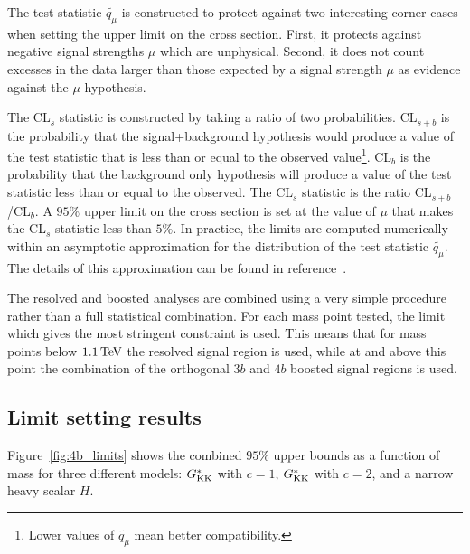 The test statistic $\widetilde{q_{\mu}}$ is constructed to protect against two interesting corner cases when setting the upper limit on the cross section. First, it protects against negative signal strengths $\mu$ which are unphysical. Second, it does not count excesses in the data larger than those expected by a signal strength $\mu$ as evidence against the $\mu$ hypothesis. 

The CL$_{s}$ statistic is constructed by taking a ratio of two probabilities. CL$_{s+b}$ is the probability that the signal+background hypothesis would produce a value of the test statistic that is less than or equal to the observed value\footnote{Lower values of $\widetilde{q_{\mu}}$ mean better compatibility.}. CL$_{b}$ is the probability that the background only hypothesis will produce a value of the test statistic less than or equal to the observed. The CL$_{s}$ statistic is the ratio CL$_{s+b}$/CL$_{b}$. A $95\%$ upper limit on the cross section is set at the value of $\mu$ that makes the CL$_{s}$ statistic less than $5\%$. In practice, the limits are computed numerically within an asymptotic approximation for the distribution of the test statistic $\widetilde{q_{\mu}}$. The details of this approximation can be found in reference~\cite{Cowan:2010st}. 

The resolved and boosted analyses are combined using a very simple procedure rather than a full statistical combination. For each mass point tested, the limit which gives the most stringent constraint is used. This means that for mass points below $1.1 \TeV$ the resolved signal region is used, while at and above this point the combination of the orthogonal $3b$ and $4b$ boosted signal regions is used. 

\subsection{Limit setting results}

Figure~\ref{fig:4b_limits} shows the combined $95\%$ upper bounds as a function of mass for three different models: $G^*_{\rm KK}$ with $c=1$, $G^*_{\rm KK}$ with $c=2$, and a narrow heavy scalar $H$. 

